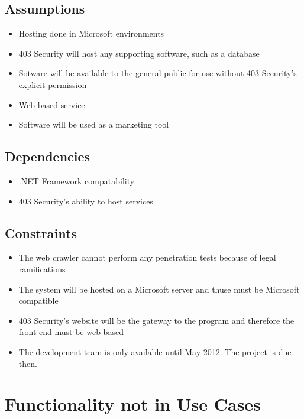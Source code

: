 \subsection{Assumptions}
\begin{itemize}
    \item Hosting done in Microsoft environments
    \item 403 Security will host any supporting software, such as a database
    \item Sotware will be available to the general public for use without 403 Security's explicit permission
    \item Web-based service
    \item Software will be used as a marketing tool
\end{itemize}

\subsection{Dependencies}
\begin{itemize}
    \item .NET Framework compatability
    \item 403 Security's ability to host services
\end{itemize}

\subsection{Constraints}
\begin{itemize}
    \item The web crawler cannot perform any penetration tests because of legal ramifications
    \item The system will be hosted on a Microsoft server and thuse must be Microsoft compatible
    \item 403 Security's website will be the gateway to the program and therefore the front-end must be web-based
    \item The development team is only available until May 2012.  The project is due then.
\end{itemize}

        \section{Functionality not in Use Cases}

